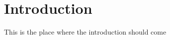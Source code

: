 \documentclass{report}
\begin{document}
	\tableofcontents
	\section{Introduction}
	This is the place where the introduction should come 
	
	
	
	
\end{document}
